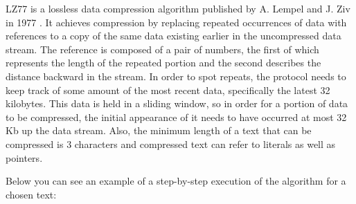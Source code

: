 LZ77 is a lossless data compression algorithm published by A. Lempel and J. Ziv
in 1977 \cite{lz77}. It achieves compression by replacing repeated occurrences
of data with references to a copy of the same data existing earlier in the
uncompressed data stream. The reference is composed of a pair of numbers, the
first of which represents the length of the repeated portion and the second
describes the distance backward in the stream. In order to spot repeats, the
protocol needs to keep track of some amount of the most recent data,
specifically the latest 32 kilobytes. This data is held in a sliding window, so
in order for a portion of data to be compressed, the initial appearance of it
needs to have occurred at most 32 Kb up the data stream. Also, the minimum
length of a text that can be compressed is 3 characters and compressed text can
refer to literals as well as pointers.

Below you can see an example of a step-by-step execution of the algorithm for a
chosen text:

